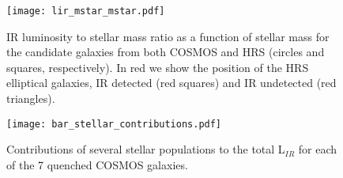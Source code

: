 \documentclass[traditabstract]{aa} %
\begin{document}
\begin{figure}[!h] 
  	\texttt{[image: lir\_mstar\_mstar.pdf]}
  	\caption{\label{lirmstar} IR luminosity to stellar mass ratio as a function of stellar mass for the candidate galaxies from both COSMOS and HRS (circles and squares, respectively). In red we show the position of the HRS elliptical galaxies, IR detected (red squares) and IR undetected (red triangles).}
\end{figure}

\begin{figure}[!h] 
  	\texttt{[image: bar\_stellar\_contributions.pdf]}
  	\caption{\label{cont} Contributions of several stellar populations to the total L$_{IR}$ for each of the 7 quenched COSMOS galaxies.}
\end{figure}
\end{document}
